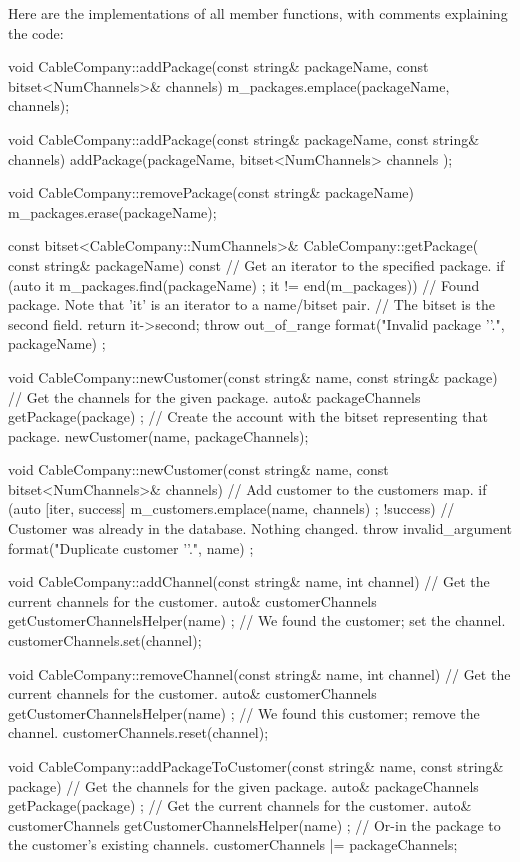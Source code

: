 Here are the implementations of all member functions, with comments explaining the code:

\begin{cpp}
void CableCompany::addPackage(const string& packageName,
    const bitset<NumChannels>& channels)
{
    m_packages.emplace(packageName, channels);
}

void CableCompany::addPackage(const string& packageName, const string& channels)
{
    addPackage(packageName, bitset<NumChannels> { channels });
}

void CableCompany::removePackage(const string& packageName)
{
    m_packages.erase(packageName);
}

const bitset<CableCompany::NumChannels>& CableCompany::getPackage(
    const string& packageName) const
{
    // Get an iterator to the specified package.
    if (auto it { m_packages.find(packageName) }; it != end(m_packages)) {
        // Found package. Note that 'it' is an iterator to a name/bitset pair.
        // The bitset is the second field.
        return it->second;
    }
    throw out_of_range { format("Invalid package '{}'.", packageName) };
}

void CableCompany::newCustomer(const string& name, const string& package)
{
    // Get the channels for the given package.
    auto& packageChannels { getPackage(package) };
    // Create the account with the bitset representing that package.
    newCustomer(name, packageChannels);
}

void CableCompany::newCustomer(const string& name,
    const bitset<NumChannels>& channels)
{
    // Add customer to the customers map.
    if (auto [iter, success] { m_customers.emplace(name, channels) }; !success) {
        // Customer was already in the database. Nothing changed.
        throw invalid_argument { format("Duplicate customer '{}'.", name) };
    }
}

void CableCompany::addChannel(const string& name, int channel)
{
    // Get the current channels for the customer.
    auto& customerChannels { getCustomerChannelsHelper(name) };
    // We found the customer; set the channel.
    customerChannels.set(channel);
}

void CableCompany::removeChannel(const string& name, int channel)
{
    // Get the current channels for the customer.
    auto& customerChannels { getCustomerChannelsHelper(name) };
    // We found this customer; remove the channel.
    customerChannels.reset(channel);
}

void CableCompany::addPackageToCustomer(const string& name, const string& package)
{
    // Get the channels for the given package.
    auto& packageChannels { getPackage(package) };
    // Get the current channels for the customer.
    auto& customerChannels { getCustomerChannelsHelper(name) };
    // Or-in the package to the customer's existing channels.
    customerChannels |= packageChannels;
}


\end{cpp}

